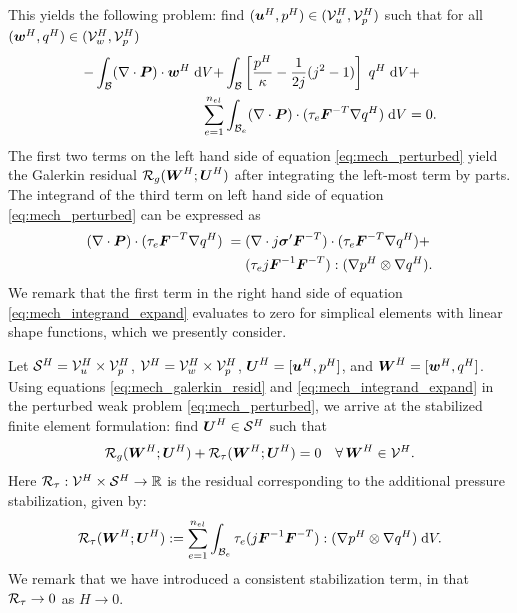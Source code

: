 This yields the following problem: find $(\boldsymbol{u}^H, p^H) \in (\mathcal{V}^H_u, \mathcal{V}^H_p)$
such that for all $(\boldsymbol{w}^H, q^H) \in (\mathcal{V}^H_w, \mathcal{V}^H_p)$
%
\begin{gather}
\begin{split}
- \int_{\mathcal{B}} (\nabla \cdot \boldsymbol{P}) \cdot \boldsymbol{w}^H \; \text{d} V +
& \int_{\mathcal{B}} \left[ \frac{p^H}{\kappa} - \frac{1}{2 j}(j^2 - 1) \right] \;
q^H \; \text{d} V + \\
\sum_{e=1}^{n_{el}} & \int_{\mathcal{B}_e} (\nabla \cdot \boldsymbol{P}) \cdot
(\tau_e \boldsymbol{F}^{-T} \nabla q^H) \; \text{d} V = 0.
\label{eq:mech_perturbed}
\end{split}
\end{gather}
%
The first two terms on the left hand side of equation
\eqref{eq:mech_perturbed} yield the Galerkin residual
$\mathcal{R}_g(\boldsymbol{W}^H ; \boldsymbol{U}^H)$ after integrating the left-most term by parts.
The integrand of the third term on left hand side of equation
\eqref{eq:mech_perturbed} can be expressed as
%
\begin{gather}
\begin{split}
(\nabla \cdot \boldsymbol{P}) \cdot (\tau_e \boldsymbol{F}^{-T} \nabla q^H) \; = \;
&(\nabla \cdot j \boldsymbol{\sigma}' \boldsymbol{F}^{-T} ) \cdot
(\tau_e \boldsymbol{F}^{-T} \nabla q^H) + \\
&(\tau_e j \boldsymbol{F}^{-1} \boldsymbol{F}^{-T}) : (\nabla p^H \otimes \nabla q^H).
\label{eq:mech_integrand_expand}
\end{split}
\end{gather}
%
We remark that the first term in the right hand side of equation
\eqref{eq:mech_integrand_expand} evaluates to zero for simplical elements
with linear shape functions, which we presently consider.

Let $\mathcal{S}^H = \mathcal{V}^H_u \times \mathcal{V}^H_p$, $\mathcal{V}^H = \mathcal{V}^H_w \times \mathcal{V}^H_p$,
$\boldsymbol{U}^H = [ \boldsymbol{u}^H, p^H ]$, and $\boldsymbol{W}^H = [ \boldsymbol{w}^H, q^H ]$.
Using equations \eqref{eq:mech_galerkin_resid} and
\eqref{eq:mech_integrand_expand} in the perturbed weak problem
\eqref{eq:mech_perturbed}, we arrive at the stabilized finite element
formulation: find $\boldsymbol{U}^H \in \mathcal{S}^H$ such that
%
\begin{gather}
\mathcal{R}_g(\boldsymbol{W}^H ; \boldsymbol{U}^H) + \mathcal{R}_{\tau}(\boldsymbol{W}^H ; \boldsymbol{U}^H) = 0
\quad \forall \, \boldsymbol{W}^H \in \mathcal{V}^H.
\label{eq:mech_stabilized_fem}
\end{gather}
%
Here $\mathcal{R}_{\tau} : \mathcal{V}^H \times \mathcal{S}^H \to \mathbb{R}$ is the residual
corresponding to the additional pressure stabilization, given by:
%
\begin{gather}
\mathcal{R}_{\tau}(\boldsymbol{W}^H ; \boldsymbol{U}^H) :=
\sum_{e=1}^{n_{el}} \int_{\mathcal{B}_e} \tau_e
(j \boldsymbol{F}^{-1} \boldsymbol{F}^{-T}) : (\nabla p^H \otimes \nabla q^H) \; \text{d} V.
\end{gather}
%
We remark that we have introduced a consistent stabilization term, in that
$\mathcal{R}_{\tau} \to 0$ as $H \to 0$.

